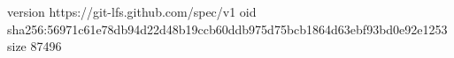 version https://git-lfs.github.com/spec/v1
oid sha256:56971c61e78db94d22d48b19ccb60ddb975d75bcb1864d63ebf93bd0e92e1253
size 87496
